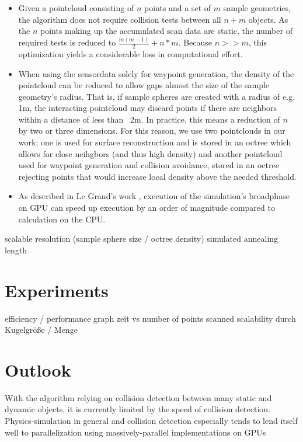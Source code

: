 \documentclass[a4paper, 10pt, conference]{ieeeconf}        %
\begin{document}
\begin{itemize}
  \item Given a pointcloud consisting of $n$ points and a set of $m$ sample geometries, the algorithm does not require collision tests between all $n+m$ objects. As the $n$ points making up the accumulated scan data are static, the number of required tests is reduced to $\frac{m(m-1)}{2} + n*m$. Because $n >> m$, this optimization yields a considerable loss in computational effort.
  \item When using the sensordata solely for waypoint generation, the density of the pointcloud can be reduced to allow gaps almost the size of the sample geometry's radius. That is, if sample spheres are created with a radius of e.g. 1m, the interacting pointcloud may discard points if there are neighbors within a distance of less than ~2m. In practice, this means a reduction of $n$ by two or three dimensions. For this reason, we use two pointclouds in our work; one is used for surface reconstruction and is stored in an octree which allows for close neihgbors (and thus high density) and another pointcloud used for waypoint generation and collision avoidance, stored in an octree rejecting points that would increase local density above the needed threshold.
  \item As described in Le Grand's work \cite{legrand2007}, execution of the simulation's broadphase on GPU can speed up execution by an order of magnitude compared to calculation on the CPU.
\end{itemize}

scalable resolution (sample sphere size / octree density)
simulated annealing length

\section{Experiments}
efficiency / performance
graph zeit vs number of points scanned
scalability durch Kugelgröße / Menge

\section{Outlook}

With the algorithm relying on collision detection between many static and dynamic objects, it is currently limited by the speed of collision detection. Physics-simulation in general and collision detection especially tends to lend itself well to parallelization using massively-parallel implementations on GPUs
\end{document}

